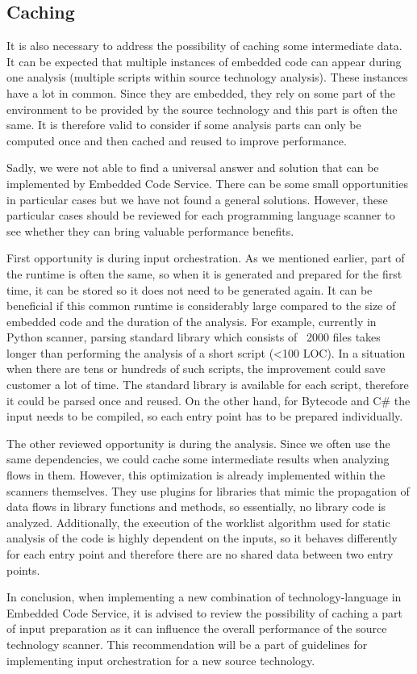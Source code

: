 \subsection{Caching}
It is also necessary to address the possibility of caching some intermediate data. It can be expected that multiple instances of embedded code can appear during one analysis (multiple scripts within source technology analysis). These instances have a lot in common. Since they are embedded, they rely on some part of the environment to be provided by the source technology and this part is often the same. It is therefore valid to consider if some analysis parts can only be computed once and then cached and reused to improve performance. 
\par
Sadly, we were not able to find a universal answer and solution that can be implemented by Embedded Code Service. There can be some small opportunities in particular cases but we have not found a general solutions. However, these particular cases should be reviewed for each programming language scanner to see whether they can bring valuable performance benefits.
\par
First opportunity is during input orchestration. As we mentioned earlier, part of the runtime is often the same, so when it is generated and prepared for the first time, it can be stored so it does not need to be generated again. It can be beneficial if this common runtime is considerably large compared to the size of embedded code and the duration of the analysis. For example, currently in Python scanner, parsing standard library which consists of ~2000 files takes longer than performing the analysis of a short script (<100 LOC). In a situation when there are tens or hundreds of such scripts, the improvement could save customer a lot of time. The standard library is available for each script, therefore it could be parsed once and reused. On the other hand, for Bytecode and C\# the input needs to be compiled, so each entry point has to be prepared individually.
\par
The other reviewed opportunity is during the analysis. Since we often use the same dependencies, we could cache some intermediate results when analyzing flows in them. However, this optimization is already implemented within the scanners themselves. They use plugins for libraries that mimic the propagation of data flows in library functions and methods, so essentially, no library code is analyzed. Additionally, the execution of the worklist algorithm used for static analysis of the code is highly dependent on the inputs, so it behaves differently for each entry point and therefore there are no shared data between two entry points.
\par
In conclusion, when implementing a new combination of technology-language in Embedded Code Service, it is advised to review the possibility of caching a part of input preparation as it can influence the overall performance of the source technology scanner. This recommendation will be a part of guidelines for implementing input orchestration for a new source technology.